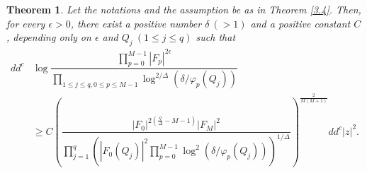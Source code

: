 \documentclass[12pt]{amsart}
\newtheorem{theorem}{Theorem}[section]
\begin{document}
\begin{theorem}\label{3.5}
Let the notations and the assumption be as in Theorem \ref{3.4}. Then, for every $\epsilon>0$, there exist a positive number $\delta\ (>1)$ and a positive constant $C$, depending only on $\epsilon$ and $Q_j\ (1\le j\le q)$ such that
\begin{align*}
dd^c&\log\dfrac{\prod_{p=0}^{M-1}|F_{p}|^{2\epsilon}}{\prod_{1\le j\le q,0\le p\le M-1}\log^{2/\Delta}\left(\delta/\varphi_{p}(Q_j)\right)}\\
&\ge C\left (\dfrac{|F_{0}|^{2\left (\frac{q}{\Delta}-M-1\right)}|F_{M}|^2}{\prod_{j=1}^q(|F_{0}(Q_j)|^2\prod_{p=0}^{M-1}\log^2(\delta/\varphi_{p}(Q_j)))^{1/\Delta}}\right)^{\frac{2}{M(M+1)}}dd^c|z|^2.
\end{align*}
\end{theorem}
\end{document}
